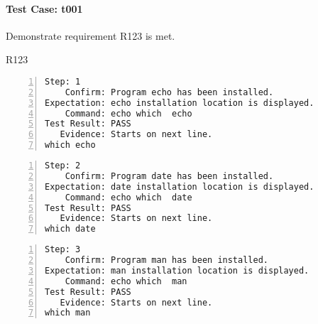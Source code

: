 \paragraph{Test Case: t001}
\begin{description}[align=right,leftmargin=*,labelindent=3cm]
\item[Purpose:] Demonstrate requirement R123 is met.
\item[Requirement:] R123
\end{description}
\begin{lstlisting}[numbers=left]
       Step: 1
    Confirm: Program echo has been installed.
Expectation: echo installation location is displayed.
    Command: echo which  echo 
Test Result: PASS
   Evidence: Starts on next line.
which echo

\end{lstlisting}
\begin{lstlisting}[numbers=left]
       Step: 2
    Confirm: Program date has been installed.
Expectation: date installation location is displayed.
    Command: echo which  date 
Test Result: PASS
   Evidence: Starts on next line.
which date

\end{lstlisting}
\begin{lstlisting}[numbers=left]
       Step: 3
    Confirm: Program man has been installed.
Expectation: man installation location is displayed.
    Command: echo which  man 
Test Result: PASS
   Evidence: Starts on next line.
which man

\end{lstlisting}
